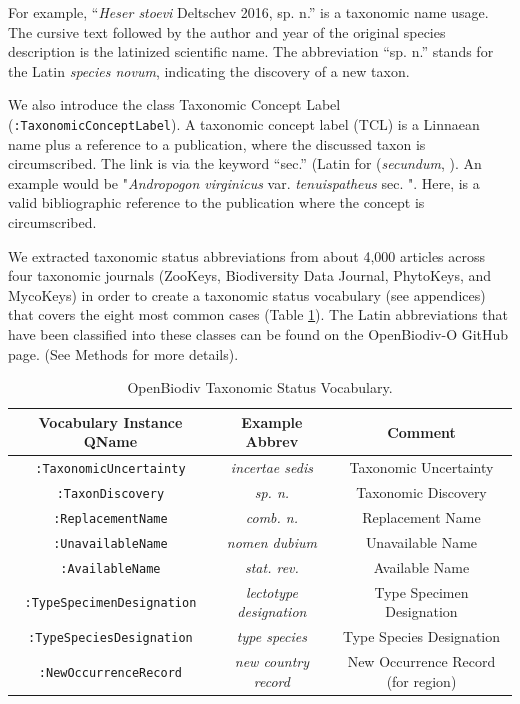 For example, ``\emph{Heser stoevi} Deltschev 2016, sp. n.'' is a taxonomic name usage. The cursive text followed by the author and year of the original species description is the latinized scientific name. The abbreviation ``sp. n.'' stands for the Latin \emph{species novum}, indicating the discovery of a new taxon.

We also introduce the class Taxonomic Concept Label ({\tt :TaxonomicConceptLabel}). A taxonomic concept label (TCL) is a Linnaean name plus a reference to a publication, where the discussed taxon is circumscribed. The link is via the keyword ``sec.'' (Latin for (\emph{secundum}, \cite{berendsohn_concept_1995}). An example would be "\emph{Andropogon virginicus} var. \emph{tenuispatheus} sec. \cite{blomquist_grasses_1948}". Here, \cite{blomquist_grasses_1948} is a valid bibliographic reference to the publication where the concept is circumscribed.

We extracted taxonomic status abbreviations from about 4,000 articles across four taxonomic journals (ZooKeys, Biodiversity Data Journal, PhytoKeys, and MycoKeys) in order to create a taxonomic status vocabulary (see appendices) that covers the eight most common cases (Table \ref{taxonomic-status-vocabulary}). The Latin abbreviations that have been classified into these classes can be found on the OpenBiodiv-O GitHub page. (See Methods for more details).

\begin{table}[h!]
\caption{OpenBiodiv Taxonomic Status Vocabulary.}
\begin{tabular}{ccc}
\hline
Vocabulary Instance QName & Example Abbrev & Comment\\ \hline
{\tt :TaxonomicUncertainty} & \emph{incertae sedis} & Taxonomic Uncertainty\\
{\tt :TaxonDiscovery} & \emph{sp. n.} & Taxonomic Discovery \\
{\tt :ReplacementName} & \emph{comb. n.} & Replacement Name \\
{\tt :UnavailableName} & \emph{nomen dubium} &  Unavailable Name \\
{\tt :AvailableName} & \emph{stat. rev.} & Available Name \\
{\tt :TypeSpecimenDesignation} & \emph{lectotype designation} & Type Specimen Designation \\
{\tt :TypeSpeciesDesignation} & \emph{type species} & Type Species Designation\\
{\tt :NewOccurrenceRecord} & \emph{new country record} & New Occurrence Record (for region)\\
\hline
\end{tabular}
\label{taxonomic-status-vocabulary}
\end{table}

